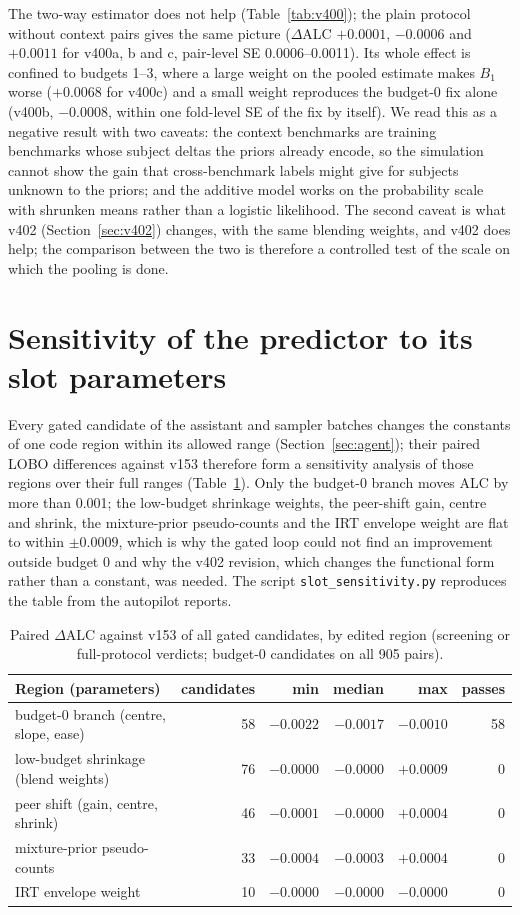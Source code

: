 \documentclass{article}
\begin{document}
The two-way estimator does not help (Table~\ref{tab:v400}); the plain protocol without context pairs gives the same picture ($\Delta$ALC $+0.0001$, $-0.0006$ and $+0.0011$ for v400a, b and c, pair-level SE 0.0006--0.0011). Its whole effect is confined to budgets 1--3, where a large weight on the pooled estimate makes $B_1$ worse ($+0.0068$ for v400c) and a small weight reproduces the budget-0 fix alone (v400b, $-0.0008$, within one fold-level SE of the fix by itself). We read this as a negative result with two caveats: the context benchmarks are training benchmarks whose subject deltas the priors already encode, so the simulation cannot show the gain that cross-benchmark labels might give for subjects unknown to the priors; and the additive model works on the probability scale with shrunken means rather than a logistic likelihood. The second caveat is what v402 (Section~\ref{sec:v402}) changes, with the same blending weights, and v402 does help; the comparison between the two is therefore a controlled test of the scale on which the pooling is done.

\section{Sensitivity of the predictor to its slot parameters}
\label{app:sens}
Every gated candidate of the assistant and sampler batches changes the constants of one code region within its allowed range (Section~\ref{sec:agent}); their paired LOBO differences against v153 therefore form a sensitivity analysis of those regions over their full ranges (Table~\ref{tab:sens}). Only the budget-0 branch moves ALC by more than 0.001; the low-budget shrinkage weights, the peer-shift gain, centre and shrink, the mixture-prior pseudo-counts and the IRT envelope weight are flat to within $\pm0.0009$, which is why the gated loop could not find an improvement outside budget 0 and why the v402 revision, which changes the functional form rather than a constant, was needed. The script \texttt{slot\_sensitivity.py} reproduces the table from the autopilot reports.

\begin{table}[h]
\caption{Paired $\Delta$ALC against v153 of all gated candidates, by edited region (screening or full-protocol verdicts; budget-0 candidates on all 905 pairs).}
\label{tab:sens}
\centering\small
\begin{tabular}{lrrrrr}
\toprule
Region (parameters) & candidates & min & median & max & passes \\
\midrule
budget-0 branch (centre, slope, ease) & 58 & $-0.0022$ & $-0.0017$ & $-0.0010$ & 58 \\
low-budget shrinkage (blend weights) & 76 & $-0.0000$ & $-0.0000$ & $+0.0009$ & 0 \\
peer shift (gain, centre, shrink) & 46 & $-0.0001$ & $-0.0000$ & $+0.0004$ & 0 \\
mixture-prior pseudo-counts & 33 & $-0.0004$ & $-0.0003$ & $+0.0004$ & 0 \\
IRT envelope weight & 10 & $-0.0000$ & $-0.0000$ & $-0.0000$ & 0 \\
\bottomrule
\end{tabular}
\end{table}
\end{document}
